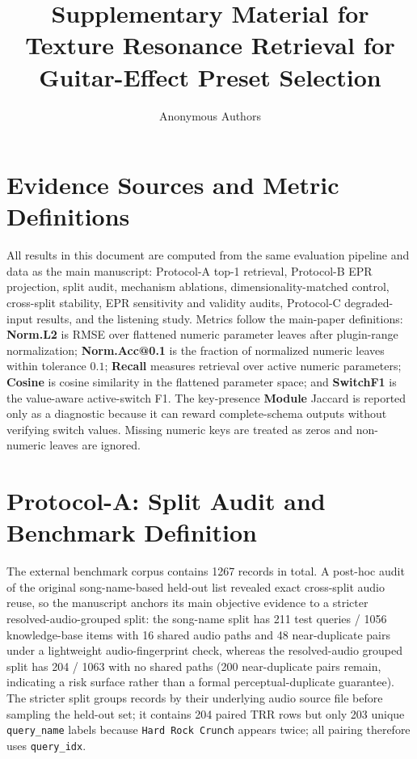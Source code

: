 \documentclass[journal,10pt]{IEEEtran}
\title{Supplementary Material for Texture Resonance Retrieval for Guitar-Effect Preset Selection}
\author{Anonymous Authors}
\begin{document}
\maketitle

\renewcommand{\thesection}{S\arabic{section}}
\renewcommand{\thetable}{S\arabic{table}}
\renewcommand{\thefigure}{S\arabic{figure}}
\setcounter{section}{0}
\setcounter{table}{0}
\setcounter{figure}{0}

\section{Evidence Sources and Metric Definitions}

All results in this document are computed from the same evaluation pipeline and data as the main manuscript: Protocol-A top-1 retrieval, Protocol-B EPR projection, split audit, mechanism ablations, dimensionality-matched control, cross-split stability, EPR sensitivity and validity audits, Protocol-C degraded-input results, and the listening study. Metrics follow the main-paper definitions: \textbf{Norm.L2} is RMSE over flattened numeric parameter leaves after plugin-range normalization; \textbf{Norm.Acc@0.1} is the fraction of normalized numeric leaves within tolerance $0.1$; \textbf{Recall} measures retrieval over active numeric parameters; \textbf{Cosine} is cosine similarity in the flattened parameter space; and \textbf{SwitchF1} is the value-aware active-switch F1. The key-presence \textbf{Module} Jaccard is reported only as a diagnostic because it can reward complete-schema outputs without verifying switch values. Missing numeric keys are treated as zeros and non-numeric leaves are ignored.

\section{Protocol-A: Split Audit and Benchmark Definition}

The external benchmark corpus contains 1267 records in total. A post-hoc audit of the original song-name-based held-out list revealed exact cross-split audio reuse, so the manuscript anchors its main objective evidence to a stricter resolved-audio-grouped split: the song-name split has 211 test queries / 1056 knowledge-base items with 16 shared audio paths and 48 near-duplicate pairs under a lightweight audio-fingerprint check, whereas the resolved-audio grouped split has 204 / 1063 with no shared paths (200 near-duplicate pairs remain, indicating a risk surface rather than a formal perceptual-duplicate guarantee). The stricter split groups records by their underlying audio source file before sampling the held-out set; it contains 204 paired TRR rows but only 203 unique \texttt{query\_name} labels because \texttt{Hard Rock Crunch} appears twice; all pairing therefore uses \texttt{query\_idx}.
\end{document}
